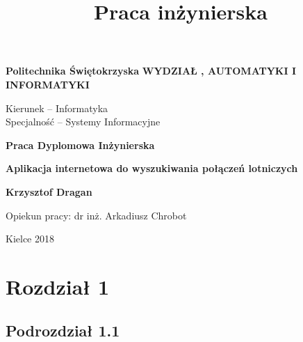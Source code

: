 \documentclass[a4paper,12pt]{article}
\title{Praca inżynierska}
\begin{document}
\begin{titlepage}
	\begin{center}
	\fontsize{20pt}{12pt}\selectfont
	\textbf{Politechnika Świętokrzyska}
	\vskip 0.5cm
	\fontsize{16pt}{12pt}\selectfont
	\textbf{WYDZIAŁ , AUTOMATYKI I INFORMATYKI}
	\end{center}
	
	\vskip 0.25cm	
	
	\begin{flushleft}
	\fontsize{14pt}{12pt}\selectfont
	Kierunek – Informatyka\\
	Specjalność – Systemy Informacyjne
	\end{flushleft}
	
	\vskip 2.5cm	
	
	\begin{center}
	\fontsize{18pt}{12pt}\selectfont
		\textbf{Praca Dyplomowa Inżynierska}
	
	\vskip 1.5cm	

	\fontsize{18pt}{12pt}\selectfont
	\textbf{Aplikacja internetowa do wyszukiwania połączeń lotniczych}
		
	\end{center}
	
	\vskip 4cm
	\begin{flushleft}
	\fontsize{18pt}{12pt}\selectfont
	\textbf{Krzysztof Dragan}\\
	\fontsize{14pt}{12pt}\selectfont
	083524
	\end{flushleft}
	
	\vskip 3cm
	\begin{flushright}
	\fontsize{14pt}{12pt}\selectfont
	Opiekun pracy: dr inż. Arkadiusz Chrobot
	\end{flushright}

	\vfill
	\begin{center}
	\fontsize{16pt}{12pt}\selectfont
		Kielce 2018
	\end{center}
\end{titlepage}
\thispagestyle{empty}

\newpage
\tableofcontents
\thispagestyle{empty}

\newpage
\clearpage
{} 
\fontsize{14pt}{12pt}\selectfont
\section{Rozdział 1}
\subsection{Podrozdział 1.1}

\newpage


\end{document}

